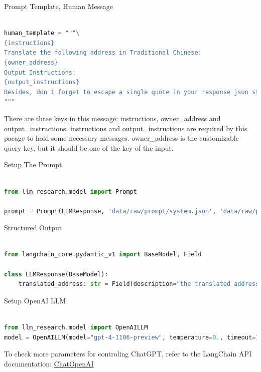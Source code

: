 \documentclass[11.5pt]{beamer}
\begin{document}
\begin{frame}[fragile]{Prompt Template, Human Message}
\begin{lstlisting}[language=Python]

human_template = """\
{instructions}
Translate the following address in Traditional Chinese:
{owner_address}
Output Instructions:
{output_instructions}
Besides, don't forget to escape a single quote in your response json string.\
"""
\end{lstlisting}

There are three keys in this message: instructions, owner\_address and
output\_instructions. instructions and output\_instructions are required by this
pacage to hold some necessary messages. owner\_address is the customizable
query key, but it should be one of the key of the input.
\end{frame}


\begin{frame}[fragile]{Setup The Prompt}
\begin{lstlisting}[language=Python]

from llm_research.model import Prompt

prompt = Prompt(LLMResponse, 'data/raw/prompt/system.json', 'data/raw/prompt/human.json')

\end{lstlisting}
\end{frame}


\begin{frame}[fragile]{Structured Output}
\begin{lstlisting}[language=Python]

from langchain_core.pydantic_v1 import BaseModel, Field

class LLMResponse(BaseModel):
    translated_address: str = Field(description="the translated address in Traditional Chinese")

\end{lstlisting}
\end{frame}


\begin{frame}[fragile]{Setup OpenAI LLM}
\begin{lstlisting}[language=Python]

from llm_research.model import OpenAILLM
model = OpenAILLM(model="gpt-4-1106-preview", temperature=0., timeout=120)

\end{lstlisting}

To check more parameters for controling ChatGPT, refer to the LangChain API
    documentation: \href{https://api.python.langchain.com/en/latest/chat_models/langchain_openai.chat_models.base.ChatOpenAI.html#langchain_openai.chat_models.base.ChatOpenAI}{ChatOpenAI}
\end{frame}
\end{document}
